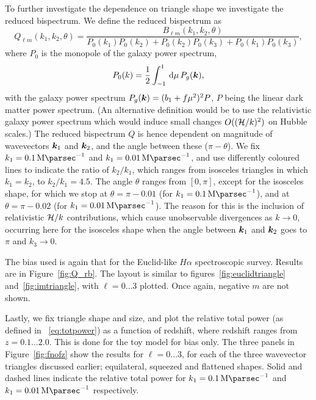 {To further investigate the dependence on triangle shape we investigate the reduced bispectrum. We define the reduced bispectrum as
\begin{equation}
	Q_{\ell m}(k_1,k_2,\theta) = \frac{B_{\ell m}(k_1,k_2,\theta)}{P_0(k_1) P_0(k_2) + P_0(k_2) P_0(k_3) + P_0(k_1) P_0(k_3)},
\end{equation}
where %
\(P_0\) is the monopole of the galaxy power spectrum,
\begin{equation}
	P_0(k) = \frac{1}{2} \int_{-1}^1 \,\mathrm{d}\mu \, P_g(\bm {k}), 
\end{equation}
with the galaxy power spectrum \(P_g(\bm {k}) = (b_1 + f \mu^2)^2 P\), \(P\) being the linear dark matter power spectrum. (An alternative definition would be to use the relativistic galaxy power spectrum which would induce small changes $O((\mathcal{H}/k)^2)$ on Hubble scales.) The reduced bispectrum \(Q\) is hence dependent on magnitude of wavevectors \(\bm {k}_1\) and \(\bm {k}_2\), and the angle  between these (\(\pi-\theta\)). We fix \(k_1 = \SI{0.1}{\mega\parsec\tothe{-1}}\) and \(k_1 = \SI{0.01}{\mega\parsec\tothe{-1}}\), and use differently coloured lines to indicate the ratio of \(k_2/k_1\), which ranges from isosceles triangles in which \(k_1 = k_2\), to \(k_2/k_1 = 4.5\). The angle \(\theta\) ranges from \([0,\pi]\), except for the isosceles shape, for which we stop at \(\theta = \pi - 0.01\) (for \(k_1 = \SI{0.1}{\mega\parsec\tothe{-1}}\)), and at \(\theta = \pi - 0.02\) (for \(k_1 = \SI{0.01}{\mega\parsec\tothe{-1}}\)). The reason for this is the inclusion of relativistic \(\mathcal{H}/k\) contributions, which cause unobservable divergences as \(k \to 0\), occurring here for the isosceles shape when the angle between \(\bm {k}_1\) and \(\bm {k}_2\) goes to \(\pi\) and \(k_3 \to 0\). 

The bias used is again that for the Euclid-like \(H\alpha\) spectroscopic survey. Results are in Figure~\ref{fig:Q_rb}. The layout is similar to figures~\ref{fig:euclidtriangle} and~\ref{fig:imtriangle}, with \(\ell = 0 \ldots 3\) plotted. Once again, negative \(m\) are not shown. 

Lastly, we fix triangle shape and size, and plot the relative total power (as defined in ~\eqref{eq:totpower}) as a function of redshift, where redshift ranges from \( z = 0.1 \ldots 2.0\). This is done for the toy model for bias only. The three panels in Figure~\ref{fig:fnofz} show the results for \(\ell = 0 \ldots 3\), for each of the three wavevector triangles discussed earlier; equilateral, squeezed and flattened shapes. Solid and dashed lines indicate the relative total power for \(k_1 = \SI{0.1}{\mega\parsec\tothe{-1}}\) and \(k_1 = \SI{0.01}{\mega\parsec\tothe{-1}}\) respectively. 

}
